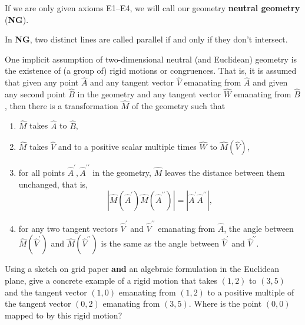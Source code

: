 \begin{definition}
If we are only given axioms E1--E4, we will call our
geometry \textbf{neutral geometry} (\textbf{NG}).
\end{definition}

\begin{definition}
In \textbf{NG}, two distinct lines are called parallel if and only if they
don't intersect.
\end{definition}

One implicit assumption of two-dimensional neutral (and Euclidean)
geometry is the existence of (a group of) rigid motions or
congruences. That is, it is assumed that given any point $\hat{A}$ and
any tangent vector $\hat{V}$ emanating from $\hat{A}$ and given any
second point $\hat{B}$ in the geometry and any tangent vector
$\hat{W}$ emanating from $\hat{B}$, then there is a transformation
$\hat{M}$ of the geometry such that
\begin{enumerate}
\item $\hat{M}$ takes $\hat{A}$ to $\hat{B}$,
\item $\hat{M}$ takes $\hat{V}$ and to a positive scalar multiple times $\hat{W}$ to $\hat{M}\left( \hat{V}\right) $,
\item for all points $\hat{A}^{\prime},\hat{A}^{\prime\prime}$ in the
geometry, $\hat{M}$ leaves the distance between them unchanged, that
is,
\[
\left\vert \hat{M}\left(  \hat{A}^{\prime}\right)  \hat{M}\left(  \hat
{A}^{\prime\prime}\right) \right\vert =\left\vert \hat{A}^{\prime}\hat
{A}^{\prime\prime}\right\vert ,
\]
\item for any two tangent vectors $\hat{V}^{\prime}$ and
$\hat{V}^{\prime\prime}$ emanating from $\hat{A}$, the angle between
$\hat{M}\left( \hat{V}^{\prime }\right) $ and
$\hat{M}\left( \hat{V}^{\prime\prime}\right) $ is the same as the
angle between $\hat{V}^{\prime}$ and $\hat{V}^{\prime\prime}$.
\end{enumerate}


\begin{exercise}
Using a sketch on grid paper \textbf{and} an algebraic formulation in
the Euclidean plane, give a concrete example of a rigid motion that
takes $\left( 1,2\right) $ to $\left( 3,5\right) $ and the tangent
vector $\left( 1,0\right) $ emanating from $\left( 1,2\right) $ to a
positive multiple of the tangent vector $\left( 0,2\right) $ emanating
from $\left( 3,5\right)$. Where is the point $(0,0)$ mapped to by this
rigid motion?
\end{exercise}

